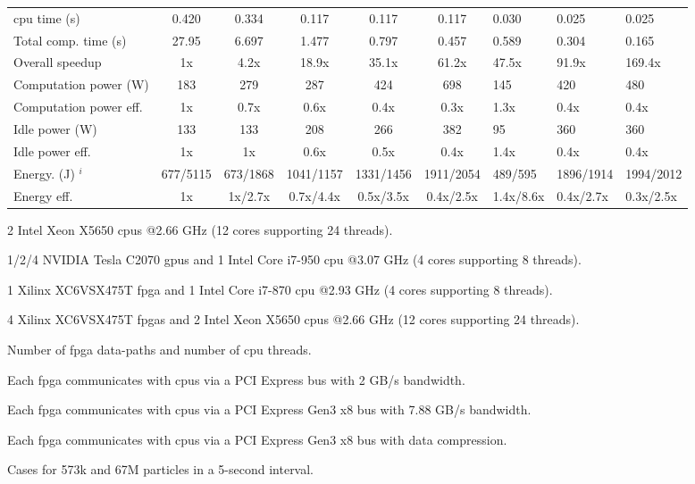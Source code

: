 \begin{table}[ht]
\begin{spacing}{1.0}
\begin{threeparttable}
\begin{tabular}{l || c c c c c g g g}
		\gls{cpu} time (s)							& 0.420							& 0.334						& 0.117						& 0.117						& 0.117						& 0.030		& 0.025		& 0.025		\\
		Total comp. time (s)  					& 27.95							& 6.697 					& 1.477						& 0.797						& 0.457						& 0.589 	& 0.304		& 0.165 	\\
		Overall speedup  						& 1x							& 4.2x	 					& 18.9x						& 35.1x						& 61.2x						& 47.5x 	& 91.9x		& 169.4x	\\
		\hline
		Computation power (W) 	   					& 183							& 279 						& 287  						& 424						& 698						& 145 		& 420		& 480		\\
		Computation power eff.						& 1x							& 0.7x						& 0.6x 						& 0.4x						& 0.3x						& 1.3x 		& 0.4x 		& 0.4x		\\
		Idle power (W)    						& 133							& 133						& 208   					& 266 						& 382						& 95		& 360		& 360		\\
		Idle power eff.					    	& 1x							& 1x						& 0.6x	 					& 0.5x						& 0.4x						& 1.4x 	& 0.4x		& 0.4x		\\
		\hline
		Energy. (J) $^i$						& 677/5115						& 673/1868 					& 1041/1157 				& 1331/1456					& 1911/2054					& 489/595 	& 1896/1914	& 1994/2012	\\
		Energy eff.							& 1x							& 1x/2.7x 					& 0.7x/4.4x 				& 0.5x/3.5x 				& 0.4x/2.5x					& 1.4x/8.6x	& 0.4x/2.7x	& 0.3x/2.5x\\
		\hline
		\end{tabular}
			\begin{tablenotes}
			\item[a] 2 Intel Xeon X5650 \glspl{cpu} @2.66 GHz (12 cores supporting 24 threads).
			\item[b] 1/2/4 NVIDIA Tesla C2070 \gls{gpu}s and 1 Intel Core i7-950 \gls{cpu} @3.07 GHz (4 cores supporting 8 threads).
			\item[c] 1 Xilinx XC6VSX475T \gls{fpga} and 1 Intel Core i7-870 \gls{cpu} @2.93 GHz (4 cores supporting 8 threads).
			\item[d] 4 Xilinx XC6VSX475T \glspl{fpga} and 2 Intel Xeon X5650 \glspl{cpu} @2.66 GHz (12 cores supporting 24 threads).
			\item[e] Number of \gls{fpga} data-paths and number of \gls{cpu} threads.
			\item[f] Each \gls{fpga} communicates with \glspl{cpu} via a PCI Express bus with 2 GB/s bandwidth.
			\item[g] Each \gls{fpga} communicates with \glspl{cpu} via a PCI Express Gen3 x8 bus with 7.88 GB/s bandwidth.
			\item[h] Each \gls{fpga} communicates with \glspl{cpu} via a PCI Express Gen3 x8 bus with data compression.
			\item[i] Cases for 573k and 67M particles in a 5-second interval.
			\end{tablenotes}
		\end{threeparttable}
\end{spacing}
\end{table}

